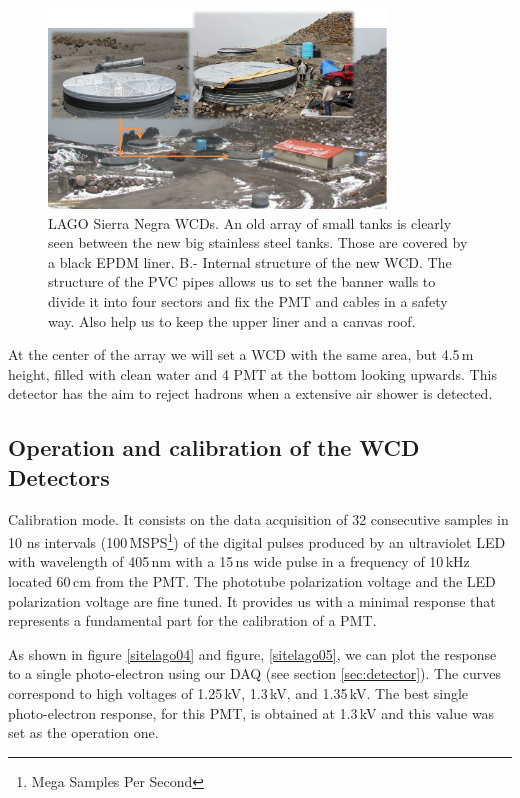 \begin{figure}[th!]
\centering
\includegraphics[width=0.8\textwidth]{images/mexico/sitelago-01.png}
\caption{LAGO Sierra Negra WCDs. An old array of small tanks is clearly seen
between the new big stainless steel tanks.  Those are covered by a black EPDM
liner. B.- Internal structure of the new WCD. The structure of the PVC pipes
allows us to set the banner walls to divide it into four sectors and fix the
PMT and cables in a safety way. Also help us to keep 
the upper liner and a canvas roof.}
\label{sitelago01}
\end{figure} 

At the center of the array we will set a WCD with the same area, but 4.5\,m height, 
filled with clean water and 4 PMT at the bottom looking upwards. This detector
has the aim to reject hadrons when a extensive air shower is detected.

\subsection*{Operation and calibration of the WCD Detectors}

Calibration mode. It consists on the data acquisition of 32 consecutive samples
in 10 ns intervals (100\,MSPS\footnote{Mega Samples Per Second}) of the digital
pulses produced by an ultraviolet LED with wavelength of 405\,nm with a 15\,ns
wide pulse in a frequency of 10\,kHz located 60\,cm from the PMT. The phototube
polarization voltage and the LED polarization voltage are fine tuned. It
provides us with a minimal response that represents a fundamental part for the
calibration of a PMT.

As shown in figure \ref{sitelago04} and figure, \ref{sitelago05}, we can plot
the response to a single photo-electron using our DAQ (see section
\ref{sec:detector}). The curves correspond to high voltages of 1.25\,kV,
1.3\,kV, and 1.35\,kV. The best single photo-electron response, for this PMT,
is obtained at 1.3\,kV and this value was set as the operation one.

